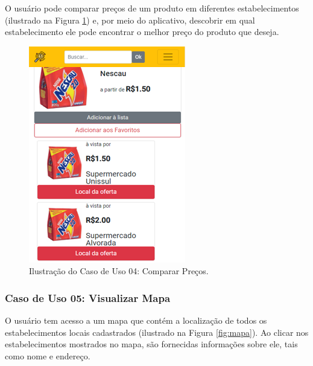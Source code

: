 O usuário pode comparar preços de um produto em diferentes estabelecimentos (ilustrado na Figura  \ref{fig:comparar}) e, por meio do aplicativo, descobrir em qual estabelecimento ele pode encontrar o melhor preço do produto que deseja.

\begin{figure}[H]
\centering
\includegraphics[width=\linewidth]{figuras/tela-comparar.png}
\caption{Ilustração do Caso de Uso 04: Comparar Preços.}
\label{fig:comparar}
\end{figure}

\subsubsection{Caso de Uso 05: Visualizar Mapa}

O usuário tem acesso a um mapa que contém a localização de todos os estabelecimentos locais cadastrados (ilustrado na Figura \ref{fig:mapa}). Ao clicar nos estabelecimentos mostrados no mapa, são fornecidas informações sobre ele, tais como nome e endereço.

